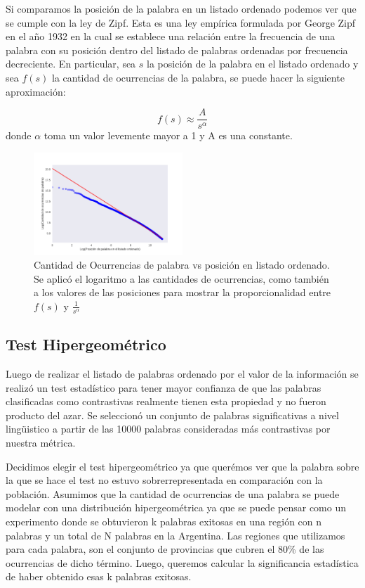Si comparamos la posición de la palabra en un listado ordenado podemos ver que se cumple con la ley de Zipf. Esta es una ley empírica formulada por George Zipf en el año 1932 en la cual se establece una relación entre la frecuencia de una palabra con su posición dentro del listado de palabras ordenadas por frecuencia decreciente. En particular, sea $s$ la posición de la palabra en el listado ordenado y sea $f(s)$ la cantidad de ocurrencias de la palabra, se puede hacer la siguiente aproximación:

$$f(s) \approx \frac{A}{s^{\alpha}}$$
donde $\alpha$ toma un valor levemente mayor a 1 y A es una constante.

\begin{figure}[!ht]
\centering
\includegraphics[width=0.5\textwidth]{./images/zipf.pdf}
\caption{Cantidad de Ocurrencias de palabra vs posición en listado ordenado. Se aplicó el logaritmo a las cantidades de ocurrencias, como también a los valores de las posiciones para mostrar la proporcionalidad entre $f(s)$ y $\frac{1}{s^{\alpha}}$} 
\label{fig:zipf} 
\end{figure}


\subsection{Test Hipergeométrico}
Luego de realizar el listado de palabras ordenado por el valor de la información se realizó un test estadístico para tener mayor confianza de que las palabras clasificadas como contrastivas realmente tienen esta propiedad y no fueron producto del azar. Se seleccionó un conjunto de palabras significativas a nivel lingüistico a partir de las 10000 palabras consideradas más contrastivas por nuestra métrica. 

Decidimos elegir el test hipergeométrico ya que querémos ver que la palabra sobre la que se hace el test no estuvo sobrerrepresentada en comparación con la población. Asumimos que la cantidad de ocurrencias de una palabra se puede modelar con una distribución hipergeométrica ya que se puede pensar como un experimento donde se obtuvieron k palabras exitosas en una región con n palabras y un total de N palabras en la Argentina. Las regiones que utilizamos para cada palabra, son el conjunto de provincias que cubren el 80\% de las ocurrencias de dicho término. Luego, queremos calcular la significancia estadística de haber obtenido esas k palabras exitosas.

